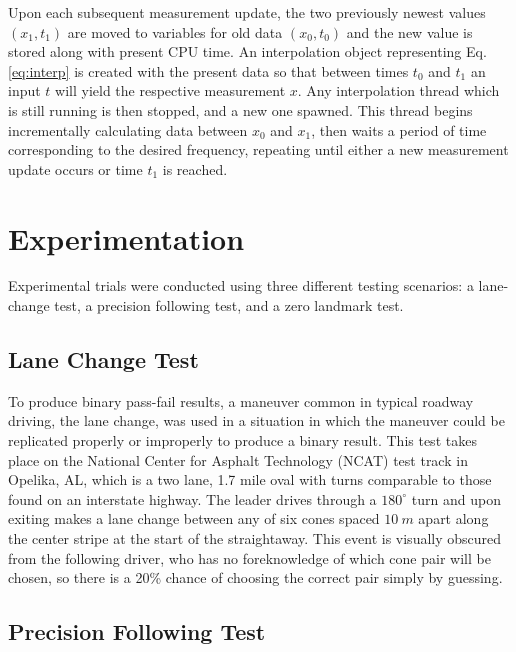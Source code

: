 \documentclass[twocolumn,10pt]{article}
\begin{document}
  Upon each subsequent measurement update, the two previously newest values $(x_1,t_1)$ are moved to variables for old data $(x_0, t_0)$ and the new value is stored along with present CPU time. An interpolation object representing Eq. \eqref{eq:interp} is created with the present data so that between times $t_0$ and $t_1$ an input $t$ will yield the respective measurement $x$. Any interpolation thread which is still running is then stopped, and a new one spawned. This thread begins incrementally calculating data between $x_0$ and $x_1$, then waits a period of time corresponding to the desired frequency, repeating until either a new measurement update occurs or time $t_1$ is reached.




\section*{Experimentation} \label{sec:exper}

  Experimental trials were conducted using three different testing scenarios: a lane-change test, a precision following test, and a zero landmark test.  

  \subsection*{Lane Change Test}

    To produce binary pass-fail results, a maneuver common in typical roadway driving, the lane change, was used in a situation in which the maneuver could be replicated properly or improperly to produce a binary result.  This test takes place on the National Center for Asphalt Technology (NCAT) test track in Opelika, AL, which is a two lane, 1.7 mile oval with turns comparable to those found on an interstate highway.  The leader drives through a $180^{\circ}$ turn and upon exiting makes a lane change between any of six cones spaced $10~m$ apart along the center stripe at the start of the straightaway.  This event is visually obscured from the following driver, who has no foreknowledge of which cone pair will be chosen, so there is a 20\% chance of choosing the correct pair simply by guessing.

  \subsection*{Precision Following Test}
\end{document}
